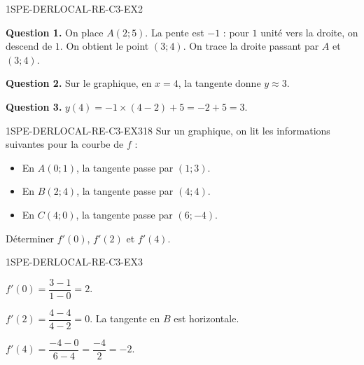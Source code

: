 
\begin{corrige}{1SPE-DERLOCAL-RE-C3-EX2}

\textbf{Question 1.} On place $A(2;5)$. La pente est $-1$ : pour $1$ unité vers la droite, on descend de $1$. On obtient le point $(3;4)$. On trace la droite passant par $A$ et $(3;4)$.

\textbf{Question 2.} Sur le graphique, en $x=4$, la tangente donne $y \approx 3$.

\textbf{Question 3.}
$y(4) = -1 \times (4-2) + 5 = -2 + 5 = 3.$ \checkmark

\end{corrige}


\begin{exercice}{1SPE-DERLOCAL-RE-C3-EX3}{1}{8}
Sur un graphique, on lit les informations suivantes pour la courbe de $f$ :
\begin{itemize}
  \item En $A(0;1)$, la tangente passe par $(1;3)$.
  \item En $B(2;4)$, la tangente passe par $(4;4)$.
  \item En $C(4;0)$, la tangente passe par $(6;-4)$.
\end{itemize}
Déterminer $f'(0)$, $f'(2)$ et $f'(4)$.
\end{exercice}


\begin{corrige}{1SPE-DERLOCAL-RE-C3-EX3}

$f'(0) = \dfrac{3-1}{1-0} = 2.$

$f'(2) = \dfrac{4-4}{4-2} = 0.$ La tangente en $B$ est horizontale.

$f'(4) = \dfrac{-4-0}{6-4} = \dfrac{-4}{2} = -2.$

\end{corrige}
